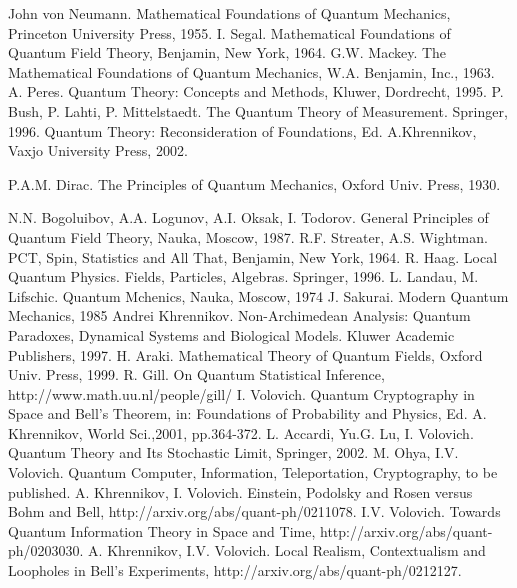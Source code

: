 \documentclass[12pt]{article}
\begin{document}
\begin{thebibliography}{99}

 John von Neumann. Mathematical Foundations of
Quantum Mechanics, Princeton University Press, 1955.
 I. Segal. Mathematical Foundations of Quantum Field
Theory, Benjamin, New York, 1964.
 G.W. Mackey. The Mathematical Foundations of Quantum
Mechanics, W.A. Benjamin, Inc., 1963.
 A. Peres. Quantum Theory: Concepts and Methods,
Kluwer, Dordrecht, 1995.
 P. Bush, P. Lahti, P. Mittelstaedt. The Quantum Theory
of Measurement. Springer, 1996.
 Quantum Theory: Reconsideration of Foundations, Ed. A.Khrennikov,
Vaxjo University Press, 2002.

 P.A.M. Dirac. The Principles of Quantum Mechanics,
Oxford Univ. Press, 1930.

 N.N. Bogoluibov, A.A. Logunov, A.I. Oksak, I.
Todorov. General Principles of Quantum Field Theory, Nauka,
Moscow, 1987.
 R.F. Streater, A.S. Wightman. PCT, Spin, Statistics
and All That, Benjamin, New York, 1964.
 R. Haag. Local Quantum Physics. Fields, Particles,
Algebras. Springer, 1996.
 L. Landau, M. Lifschic. Quantum Mchenics, Nauka,
Moscow, 1974
 J. Sakurai. Modern Quantum Mechanics, 1985
 Andrei Khrennikov. Non-Archimedean Analysis: Quantum
Paradoxes, Dynamical Systems and Biological Models. Kluwer
Academic Publishers, 1997.
 H. Araki. Mathematical Theory of Quantum Fields,
Oxford Univ. Press, 1999.
R. Gill. On Quantum Statistical Inference, 
http://www.math.uu.nl/people/gill/
 I. Volovich.  Quantum Cryptography in Space and Bell's Theorem,
in: Foundations of Probability and Physics, Ed. A. Khrennikov,
World Sci.,2001, pp.364-372.
\bibitem{} L. Accardi, Yu.G. Lu, I. Volovich. Quantum Theory and Its
Stochastic Limit, Springer, 2002.
 M. Ohya, I.V. Volovich. Quantum Computer,
Information, Teleportation, Cryptography, to be published.
 A. Khrennikov, I. Volovich. Einstein, Podolsky and
Rosen versus Bohm and Bell, http://arxiv.org/abs/quant-ph/0211078.
 I.V. Volovich. Towards Quantum Information Theory
in Space and Time, http://arxiv.org/abs/quant-ph/0203030.
 A. Khrennikov, I.V. Volovich. Local Realism,
Contextualism and Loopholes in Bell's Experiments,
http://arxiv.org/abs/quant-ph/0212127.
\end{thebibliography}
\end{document}
